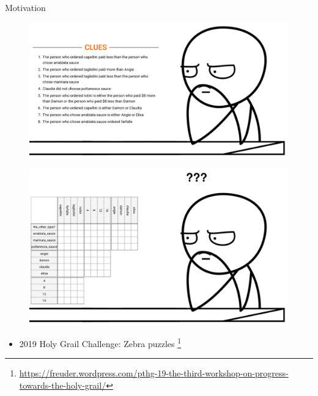 \documentclass{beamer}
\begin{document}
\begin{frame}{Motivation}
    \begin{minipage}[t]{0.48\linewidth}
        \centering
        \vspace{0.46cm}
        \begin{figure}[h]
            \includegraphics[width=\textwidth]{figures/meme_clues}
            \label{clues}
        \end{figure}
    \end{minipage}\hfill
    \begin{minipage}[t]{0.48\linewidth}
        \centering
        \begin{figure}[h]
            \includegraphics[width=\textwidth]{figures/meme}
            \label{grid}
        \end{figure}
    \end{minipage}
    \pause
    \begin{itemize}
        \item 2019 Holy Grail Challenge: Zebra puzzles \footnote{\tiny\url{https://freuder.wordpress.com/pthg-19-the-third-workshop-on-progress-towards-the-holy-grail/}}

\end{itemize}
\end{frame}
\end{document}

